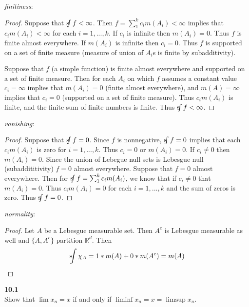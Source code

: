 \documentclass[12pt]{article}
\newcommand{\problem}[1]{\hspace{-4 ex} \large \textbf{#1}\\}
\newcommand{\sint}{\text{s}\kern-5pt\int}
\begin{document}
	\emph{finitiness}: \\
	\begin{proof}
		Suppose that $\sint f < \infty$. Then $f=\sum_1^kc_i m(A_i) < \infty$ implies that $c_i m(A_i) < \infty$ for each $i=1,...,k$. If $c_i$ is infinite then $m(A_i) = 0$. Thus $f$ is finite almost everywhere. If $m(A_i)$ is infinite then $c_i = 0$. Thus $f$ is supported on a set of finite measure (measure of union of $A_i$s is finite by subadditivity).\bigbreak
		
		Suppose that $f$ (a simple function) is finite almost everywhere and supported on a set of finite measure. Then for each $A_i$ on which $f$ assumes a constant value $c_i = \infty$ implies that $m(A_i) = 0$ (finite almost everywhere), and $m(A)=\infty$ implies that $c_i=0$ (supported on a set of finite measure). Thus $c_i m(A_i)$ is finite, and the finite sum of finite numbers is finite. Thus $\sint f < \infty$.
	\end{proof}

	\emph{vanishing}: \\
	\begin{proof}
		Suppose that $\sint f=0$. Since $f$ is nonnegative, $\sint f=0$ implies that each $c_i m(A_i)$ is zero for $i=1,...,k$. Thus $c_i = 0$ or $m(A_i)=0$. If $c_i \neq 0$ then $m(A_i)=0$. Since the union of Lebegue null sets is Lebesgue null (subaddititivity) $f=0$ almost everywhere. \bigbreak
		Suppose that $f=0$ almost everywhere. Then for $\sint f = \sum_1^k c_i m(A_i)$, we know that if $c_i \neq 0$ that $m(A_i) = 0$. Thus $c_i m(A_i) = 0$ for each $i=1,...,k$ and the sum of zeros is zero. Thus $\sint f = 0$.
	\end{proof}

	\emph{normality}: \\
	\begin{proof}
		Let $A$ be a Lebesgue measurable set. Then $A^c$ is Lebesgue measurable as well and $\{A, A^c\}$ partition $\mathbb{R}^d$. Then $$\sint \chi_A = 1*m(A) + 0*m(A^c) = m(A)$$
	\end{proof}
	

\problem{10.1} Show that $\lim x_n=x$ if and only if $\liminf x_n=x=\limsup x_n$.
\end{document}
